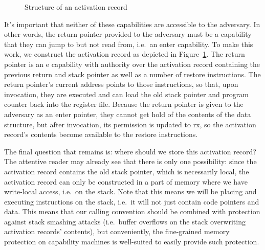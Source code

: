 \documentclass[compsoc,conference,letterpaper,fleqn]{IEEEtran}
\newcommand{\plainperm}[1]{\mathrm{#1}}
\newcommand{\exec}{\plainperm{rx}}
\newcommand{\entry}{\plainperm{e}}
\begin{document}
\begin{figure}
  
  \caption{Structure of an activation record}
  \label{fig:activ-rec-struct}
\end{figure}

It's important that neither of these capabilities are accessible to the
adversary. In other words, the return pointer provided to the adversary must be
a capability that they can jump to but not read from, i.e.\ an enter
capability. To make this work, we construct the activation record as depicted in
Figure~\ref{fig:activ-rec-struct}. The return pointer is an $\entry$ capability
with authority over the activation record containing the previous return and
stack pointer as well as a number of restore instructions. The return pointer's
current address points to those instructions, so that, upon invocation, they are
executed and can load the old stack pointer and program counter back into the
register file. Because the return pointer is given to the adversary as an enter
pointer, they cannot get hold of the contents of the data structure, but after
invocation, its permission is updated to $\exec$, so the activation record's
contents become available to the restore instructions.

The final question that remains is: where should we store this activation
record? The attentive reader may already see that there is only one possibility:
since the activation record contains the old stack pointer, which is necessarily
local, the activation record can only be constructed in a part of memory where
we have write-local access, i.e.\ on the stack. Note that this means we will be
placing and executing instructions on the stack, i.e.\ it will not just contain
code pointers and data. This means that our calling convention should be
combined with protection against stack smashing attacks (i.e.\ buffer overflows
on the stack overwriting activation records' contents), but conveniently, the
fine-grained memory protection on capability machines is well-suited to easily
provide such protection.
\end{document}
